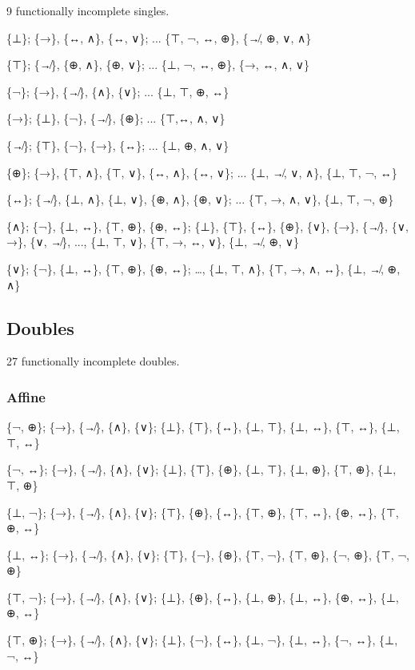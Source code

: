 9 functionally incomplete singles.

\{⊥\}; \{→\}, \{↔, ∧\}, \{↔, ∨\}; ... \{⊤, ¬, ↔, ⊕\}, \{↛, ⊕, ∨, ∧\}

\{⊤\}; \{↛\}, \{⊕, ∧\}, \{⊕, ∨\}; ... \{⊥, ¬, ↔, ⊕\}, \{→, ↔, ∧, ∨\}

\{¬\}; \{→\}, \{↛\}, \{∧\}, \{∨\}; ... \{⊥, ⊤, ⊕, ↔\}

\{→\}; \{⊥\}, \{¬\}, \{↛\}, \{⊕\}; ... \{⊤,↔, ∧, ∨\}

\{↛\}; \{⊤\}, \{¬\}, \{→\}, \{↔\}; ... \{⊥, ⊕, ∧, ∨\}

\{⊕\}; \{→\}, \{⊤, ∧\}, \{⊤, ∨\}, \{↔, ∧\}, \{↔, ∨\}; ... \{⊥, ↛, ∨,
∧\}, \{⊥, ⊤, ¬, ↔\}

\{↔\}; \{↛\}, \{⊥, ∧\}, \{⊥, ∨\}, \{⊕, ∧\}, \{⊕, ∨\}; ... \{⊤, →, ∧,
∨\}, \{⊥, ⊤, ¬, ⊕\}

\{∧\}; \{¬\}, \{⊥, ↔\}, \{⊤, ⊕\}, \{⊕, ↔\}; \{⊥\}, \{⊤\}, \{↔\}, \{⊕\},
\{∨\}, \{→\}, \{↛\}, \{∨, →\}, \{∨, ↛\}, ..., \{⊥, ⊤, ∨\}, \{⊤, →, ↔,
∨\}, \{⊥, ↛, ⊕, ∨\}

\{∨\}; \{¬\}, \{⊥, ↔\}, \{⊤, ⊕\}, \{⊕, ↔\}; \ldots, \{⊥, ⊤, ∧\}, \{⊤, →,
∧, ↔\}, \{⊥, ↛, ⊕, ∧\}

\hypertarget{doubles-1}{%
\subsection{Doubles}\label{doubles-1}}

27 functionally incomplete doubles.

\hypertarget{affine}{%
\subsubsection{Affine}\label{affine}}

\{¬, ⊕\}; \{→\}, \{↛\}, \{∧\}, \{∨\}; \{⊥\}, \{⊤\}, \{↔\}, \{⊥, ⊤\},
\{⊥, ↔\}, \{⊤, ↔\}, \{⊥, ⊤, ↔\}

\{¬, ↔\}; \{→\}, \{↛\}, \{∧\}, \{∨\}; \{⊥\}, \{⊤\}, \{⊕\}, \{⊥, ⊤\},
\{⊥, ⊕\}, \{⊤, ⊕\}, \{⊥, ⊤, ⊕\}

\{⊥, ¬\}; \{→\}, \{↛\}, \{∧\}, \{∨\}; \{⊤\}, \{⊕\}, \{↔\}, \{⊤, ⊕\},
\{⊤, ↔\}, \{⊕, ↔\}, \{⊤, ⊕, ↔\}

\{⊥, ↔\}; \{→\}, \{↛\}, \{∧\}, \{∨\}; \{⊤\}, \{¬\}, \{⊕\}, \{⊤, ¬\},
\{⊤, ⊕\}, \{¬, ⊕\}, \{⊤, ¬, ⊕\}

\{⊤, ¬\}; \{→\}, \{↛\}, \{∧\}, \{∨\}; \{⊥\}, \{⊕\}, \{↔\}, \{⊥, ⊕\},
\{⊥, ↔\}, \{⊕, ↔\}, \{⊥, ⊕, ↔\}

\{⊤, ⊕\}; \{→\}, \{↛\}, \{∧\}, \{∨\}; \{⊥\}, \{¬\}, \{↔\}, \{⊥, ¬\},
\{⊥, ↔\}, \{¬, ↔\}, \{⊥, ¬, ↔\}

